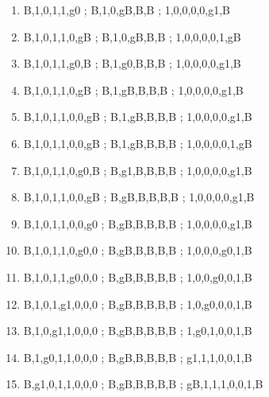 \documentclass[leqno]{article}
\begin{document}
\begin{enumerate}
                    \item {}      {B,1,0,1,1,g0 ; B,1,0,gB,B,B ; 1,0,0,0,0,g1,B}
                    \item {}    {B,1,0,1,1,0,gB ; B,1,0,gB,B,B ; 1,0,0,0,0,1,gB}
                    \item {}       {B,1,0,1,1,g0,B ; B,1,g0,B,B,B ; 1,0,0,0,0,g1,B}
                    \item {}      {B,1,0,1,1,0,gB ; B,1,gB,B,B,B ; 1,0,0,0,0,g1,B}
                    \item {}     {B,1,0,1,1,0,0,gB ; B,1,gB,B,B,B ; 1,0,0,0,0,g1,B}
                    \item {}    {B,1,0,1,1,0,0,gB ; B,1,gB,B,B,B ; 1,0,0,0,0,1,gB}
                    \item {}       {B,1,0,1,1,0,g0,B ; B,g1,B,B,B,B ; 1,0,0,0,0,g1,B}
                    \item {}      {B,1,0,1,1,0,0,gB ; B,gB,B,B,B,B ; 1,0,0,0,0,g1,B}
                    \item {}      {B,1,0,1,1,0,0,g0 ; B,gB,B,B,B,B ; 1,0,0,0,0,g1,B}
                    \item {}      {B,1,0,1,1,0,g0,0 ; B,gB,B,B,B,B ; 1,0,0,0,g0,1,B}
                    \item {}      {B,1,0,1,1,g0,0,0 ; B,gB,B,B,B,B ; 1,0,0,g0,0,1,B}
                    \item {}      {B,1,0,1,g1,0,0,0 ; B,gB,B,B,B,B ; 1,0,g0,0,0,1,B}
                    \item {}      {B,1,0,g1,1,0,0,0 ; B,gB,B,B,B,B ; 1,g0,1,0,0,1,B}
                    \item {}      {B,1,g0,1,1,0,0,0 ; B,gB,B,B,B,B ; g1,1,1,0,0,1,B}
                    \item {}     {B,g1,0,1,1,0,0,0 ; B,gB,B,B,B,B ; gB,1,1,1,0,0,1,B}

\end{enumerate}
\end{document}
